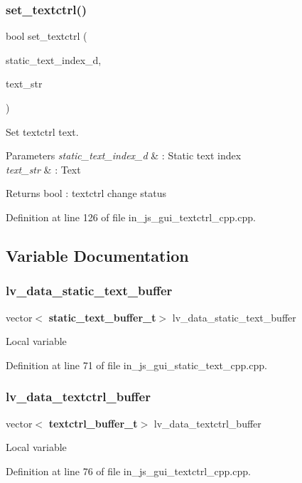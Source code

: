 \mbox{\label{group___static__text_gac548fb78081658e2d6ac4e0480210e59}} 
\subsubsection{set\_textctrl()}
{\footnotesize\ttfamily bool set\+\_\+textctrl (\begin{DoxyParamCaption}\item[{double}]{static\+\_\+text\+\_\+index\+\_\+d,  }\item[{wx\+String}]{text\+\_\+str }\end{DoxyParamCaption})}



Set textctrl text. 


\begin{DoxyParams}{Parameters}
{\em static\+\_\+text\+\_\+index\+\_\+d} & \+: Static text index \\
\hline
{\em text\+\_\+str} & \+: Text \\
\hline
\end{DoxyParams}
\begin{DoxyReturn}{Returns}
bool \+: textctrl change status 
\end{DoxyReturn}


Definition at line 126 of file in\+\_\+js\+\_\+gui\+\_\+textctrl\+\_\+cpp.\+cpp.



\subsection{Variable Documentation}
\mbox{\label{group___static__text_ga3182f133a872d9df1f836e8210e1f9d2}} 
\subsubsection{lv\_data\_static\_text\_buffer}
{\footnotesize\ttfamily vector$<$\textbf{ static\+\_\+text\+\_\+buffer\+\_\+t}$>$ lv\+\_\+data\+\_\+static\+\_\+text\+\_\+buffer}

Local variable 

Definition at line 71 of file in\+\_\+js\+\_\+gui\+\_\+static\+\_\+text\+\_\+cpp.\+cpp.

\mbox{\label{group___static__text_gaedebfc4d8564330649b912c46ee244a3}} 
\subsubsection{lv\_data\_textctrl\_buffer}
{\footnotesize\ttfamily vector$<$\textbf{ textctrl\+\_\+buffer\+\_\+t}$>$ lv\+\_\+data\+\_\+textctrl\+\_\+buffer}

Local variable 

Definition at line 76 of file in\+\_\+js\+\_\+gui\+\_\+textctrl\+\_\+cpp.\+cpp.

